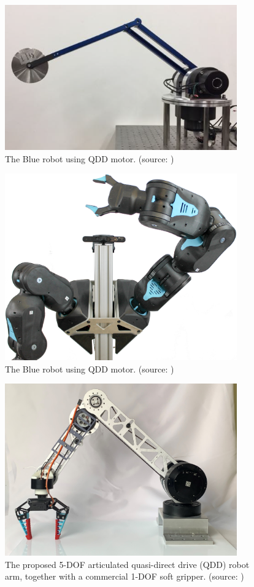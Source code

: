 \begin{figure}[h]
  \centering
  \includegraphics[width=10cm]{images/3DofArm.png}
  \caption{The Blue robot using QDD motor. (source: \cite{飯塚浩太2021})}
  \label{fig:3DofArm}
\end{figure}
\begin{figure}[h]
  \centering
  \includegraphics[width=10cm]{images/twoArmTeaser.jpg}
  \caption{The Blue robot using QDD motor. (source: \cite{Blue:online})}
  \label{fig:blue}
\end{figure}
\begin{figure}[h]
  \centering
  \includegraphics[width=10cm]{images/qddarm.png}
  \caption{The proposed 5-DOF articulated quasi-direct drive (QDD) robot arm,
  together with a commercial 1-DOF soft gripper. (source: \cite{10106520})}
  \label{fig:qddarm}
\end{figure}
\clearpage
